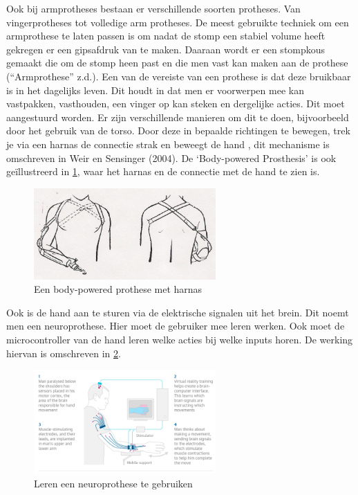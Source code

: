 Ook bij armprotheses bestaan er verschillende soorten protheses. Van
vingerprotheses tot volledige arm protheses. De meest gebruikte techniek
om een armprothese te laten passen is om nadat de stomp een stabiel
volume heeft gekregen er een gipsafdruk van te maken. Daaraan wordt er
een stompkous gemaakt die om de stomp heen past en die men vast kan
maken aan de prothese (``Armprothese'' z.d.). Een van de vereiste van
een prothese is dat deze bruikbaar is in het dagelijks leven. Dit houdt
in dat men er voorwerpen mee kan vastpakken, vasthouden, een vinger op
kan steken en dergelijke acties. Dit moet aangestuurd worden. Er zijn
verschillende manieren om dit te doen, bijvoorbeeld door het gebruik van
de torso. Door deze in bepaalde richtingen te bewegen, trek je via een
harnas de connectie strak en beweegt de hand , dit mechanisme is
omschreven in Weir en Sensinger (2004). De `Body-powered Prosthesis' is
ook geïllustreerd in \cref{fig:harnas}, waar het harnas
en de connectie met de hand te zien is.

\begin{figure}
\centering
\includegraphics[width=0.62\textwidth,height=\textheight]{img/image_1.jpg}
\caption{Een body-powered prothese met harnas\label{fig:harnas}}
\end{figure}

Ook is de hand aan te sturen via de elektrische signalen uit het brein.
Dit noemt men een neuroprothese. Hier moet de gebruiker mee leren
werken. Ook moet de microcontroller van de hand leren welke acties bij
welke inputs horen. De werking hiervan is omschreven in
\cref{fig:leren}.

\begin{figure}
\centering
\includegraphics[width=0.62\textwidth,height=\textheight]{img/image_2.png}
\caption{Leren een neuroprothese te gebruiken\label{fig:leren}}
\end{figure}

